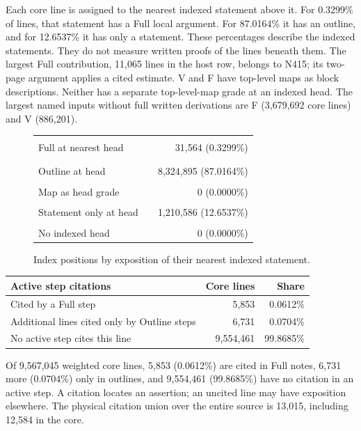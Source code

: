 Each core line is assigned to the nearest indexed statement above it. For 0.3299\% of lines, that statement has a Full local argument. For 87.0164\% it has an outline, and for 12.6537\% it has only a statement. These percentages describe the indexed statements. They do not measure written proofs of the lines beneath them. The largest Full contribution, 11,065 lines in the host row, belongs to N415; its two-page argument applies a cited estimate. V and F have top-level maps as block descriptions. Neither has a separate top-level-map grade at an indexed head. The largest named inputs without full written derivations are F (3,679,692 core lines) and V (886,201).

\begin{figure}[htbp]\centering\footnotesize
\begin{tabular}{@{}l l r@{}}
Full at nearest head & \textcolor{black!90}{\rule{0.001056\linewidth}{1.1ex}} & 31,564 (0.3299\%) \\
Outline at head & \textcolor{black!78}{\rule{0.278452\linewidth}{1.1ex}} & 8,324,895 (87.0164\%) \\
Map as head grade & \textcolor{black!66}{\rule{0.000000\linewidth}{1.1ex}} & 0 (0.0000\%) \\
Statement only at head & \textcolor{black!54}{\rule{0.040492\linewidth}{1.1ex}} & 1,210,586 (12.6537\%) \\
No indexed head & \textcolor{black!42}{\rule{0.000000\linewidth}{1.1ex}} & 0 (0.0000\%) \\
\end{tabular}\caption{Index positions by exposition of their nearest indexed statement.}\label{fig:v7-coverage}\end{figure}

\begin{center}\small\begin{tabular}{@{}lrr@{}}\toprule
Active step citations & Core lines & Share \\ \midrule
Cited by a Full step & 5,853 & 0.0612\% \\
Additional lines cited only by Outline steps & 6,731 & 0.0704\% \\
No active step cites this line & 9,554,461 & 99.8685\% \\
\bottomrule\end{tabular}\end{center}

Of 9,567,045 weighted core lines, 5,853 (0.0612\%) are cited in Full notes, 6,731 more (0.0704\%) only in outlines, and 9,554,461 (99.8685\%) have no citation in an active step. A citation locates an assertion; an uncited line may have exposition elsewhere. The physical citation union over the entire source is 13,015, including 12,584 in the core.

